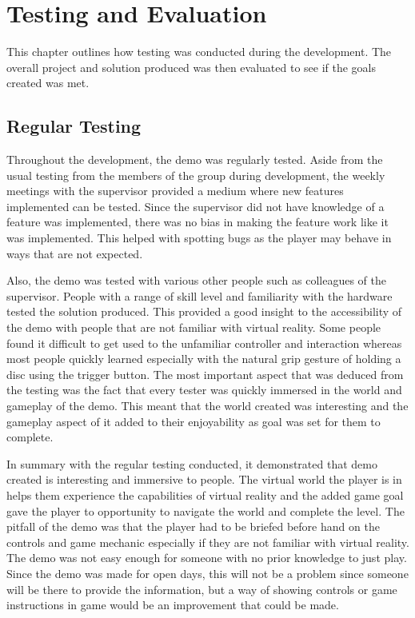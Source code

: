 \chapter{Testing and Evaluation}
\label{chapter7}

This chapter outlines how testing was conducted during the development. The overall project and solution produced was then evaluated to see if the goals created was met.

\section{Regular Testing}
Throughout the development, the demo was regularly tested. Aside from the usual testing from the members of the group during development, the weekly meetings with the supervisor provided a medium where new features implemented can be tested. Since the supervisor did not have knowledge of a feature was implemented, there was no bias in making the feature work like it was implemented. This helped with spotting bugs as the player may behave in ways that are not expected. 
\newline
\par
Also, the demo was tested with various other people such as colleagues of the supervisor. People with a range of skill level and familiarity with the hardware tested the solution produced. This provided a good insight to the accessibility of the demo with people that are not familiar with virtual reality. Some people found it difficult to get used to the unfamiliar controller and interaction whereas most people quickly learned especially with the natural grip gesture of holding a disc using the trigger button. The most important aspect that was deduced from the testing was the fact that every tester was quickly immersed in the world and gameplay of the demo. This meant that the world created was interesting and the gameplay aspect of it added to their enjoyability as goal was set for them to complete.
\newline
\par
In summary with the regular testing conducted, it demonstrated that demo created is interesting and immersive to people. The virtual world the player is in helps them experience the capabilities of virtual reality and the added game goal gave the player to opportunity to navigate the world and complete the level. The pitfall of the demo was that the player had to be briefed before hand on the controls and game mechanic especially if they are not familiar with virtual reality. The demo was not easy enough for someone with no prior knowledge to just play. Since the demo was made for open days, this will not be a problem since someone will be there to provide the information, but a way of showing controls or game instructions in game would be an improvement that could be made.

